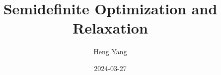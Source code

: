 \documentclass[
]{book}
\title{Semidefinite Optimization and Relaxation}
\author{Heng Yang}
\date{2024-03-27}
\theoremstyle{definition}
\theoremstyle{definition}
\theoremstyle{definition}
\theoremstyle{definition}
\theoremstyle{remark}
\begin{document}
\maketitle

{
\setcounter{tocdepth}{1}
\tableofcontents
}
\newcommand{\calG}{\mathcal{G}}
\newcommand{\calV}{\mathcal{V}}
\newcommand{\calE}{\mathcal{E}}
\newcommand{\calF}{\mathcal{F}}
\newcommand{\calP}{\mathcal{P}}
\newcommand{\calQ}{\mathcal{Q}}
\newcommand{\calA}{\mathcal{A}}
\newcommand{\calK}{\mathcal{K}}
\newcommand{\calS}{\mathcal{S}}
\newcommand{\calM}{\mathcal{M}}
\newcommand{\calI}{\mathcal{I}}
\newcommand{\calR}{\mathcal{R}}
\newcommand{\calZ}{\mathcal{Z}}
\newcommand{\mathx}{\mathrm{x}}
\newcommand{\mathy}{\mathrm{y}}
\newcommand{\bbE}{\mathbb{E}}
\newcommand{\calN}{\mathcal{N}}
\newcommand{\tldR}{\tilde{R}}
\newcommand{\bbZ}{\mathbb{Z}}
\newcommand{\bbQ}{\mathbb{Q}}
\newcommand{\bbC}{\mathbb{C}}
\newcommand{\bbF}{\mathbb{F}}
\newcommand{\bbR}{\mathbb{R}}

\newcommand{\Real}[1]{\mathbb{R}^{#1}}
\newcommand{\Comp}[1]{\mathbb{C}^{#1}}
\newcommand{\sym}[1]{\mathbb{S}^{#1}}
\newcommand{\psd}[1]{\sym{#1}_{+}}
\newcommand{\pd}[1]{\sym{#1}_{++}}
\newcommand{\inprod}[2]{\langle #1, #2 \rangle}
\newcommand{\linprod}[2]{\left\langle #1, #2 \right\rangle}
\newcommand{\trace}{\mathrm{tr}}
\newcommand{\tran}{^\top}

\newcommand{\rank}{\mathrm{rank}}
\newcommand{\diag}{\mathrm{diag}}
\newcommand{\Diag}{\mathrm{Diag}}
\newcommand{\BlkDiag}{\mathrm{BlkDiag}}
\newcommand{\vectorize}{\mathrm{vec}}
\newcommand{\svec}{\mathrm{svec}}
\newcommand{\mat}{\mathrm{mat}}
\newcommand{\smat}{\mathrm{smat}}
\newcommand{\norm}[1]{\Vert #1 \Vert}
\newcommand{\lnorm}[1]{\left\Vert #1 \right\Vert}
\newcommand{\pnorm}[2]{\Vert #1 \Vert_{#2}}
\newcommand{\Fnorm}[1]{\Vert #1 \Vert_\mathrm{F}}
\newcommand{\conv}{\mathrm{conv}}
\newcommand{\cone}{\mathrm{cone}}
\newcommand{\interior}{\mathrm{int}}
\newcommand{\relint}{\mathrm{ri}}
\newcommand{\poly}[1]{\mathbb{R}[#1]}
\newcommand{\SOd}{\mathrm{SO}(d)}
\newcommand{\SOthree}{\mathrm{SO}(3)}
\newcommand{\Od}{\mathrm{O}(d)}
\newcommand{\Ogroup}{\mathrm{O}}
\newcommand{\usphere}{\mathcal{S}}
\newcommand{\bmath}[1]{\boldsymbol{#1}}
\newcommand{\lbrkt}{[\![}
\newcommand{\rbrkt}{]\!]}
\newcommand{\brkt}[1]{\lbrkt #1 \rbrkt}
\newcommand{\bracket}[1]{[ #1 ]}
\newcommand{\sign}{\mathrm{sgn}}
\end{document}

